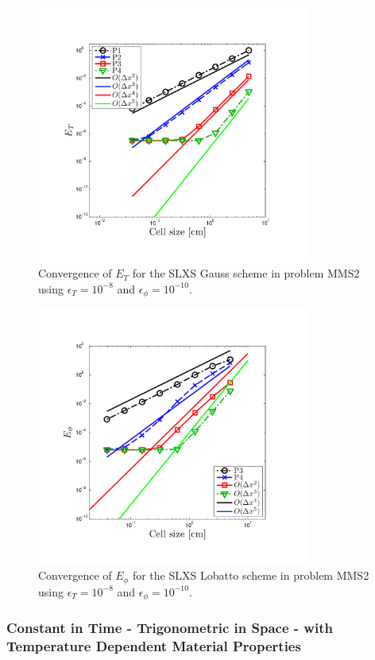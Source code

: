 \begin{figure}[!htp]
\centering
\includegraphics[width=9cm,trim=0.5in  0.5in 1in 0.75in,clip=true]{chapter6_grey_radtran/Dissertation_Data/MMS3_Low_Tol_SLXS_Gauss_temp_L2.pdf}
\caption{Convergence of $E_{T}$ for the SLXS Gauss scheme in problem MMS2 using $\epsilon_T = 10^{-8}$ and $\epsilon_{\phi}=10^{-10}$.}
\label{fig:low_tol_slxs_gauss_temp}
\end{figure}
%
%
\begin{figure}[!hbp]
\centering
\includegraphics[width=9cm,trim=0.5in  0.5in 1in 0.75in,clip=true]{chapter6_grey_radtran/Dissertation_Data/MMS3_Low_Tol_SLXS_Lobatto_phi_L2.pdf}
\caption{Convergence of $E_{\phi}$ for the SLXS Lobatto scheme in problem MMS2 using $\epsilon_T = 10^{-8}$ and $\epsilon_{\phi}=10^{-10}$.}
\label{fig:low_tol_slxs_lobatto_phi}
\end{figure}

\subsubsection{Constant in Time - Trigonometric in Space - with Temperature Dependent Material Properties}

